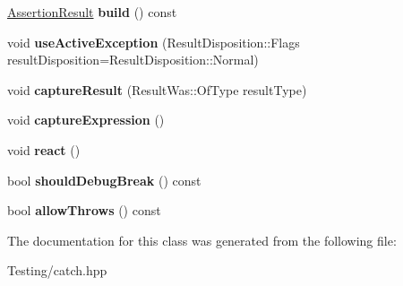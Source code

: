 \begin{DoxyCompactItemize}
\item 
\hypertarget{class_catch_1_1_result_builder_a31eba48feb02817d2151e31bd8331eeb}{\hyperlink{class_catch_1_1_assertion_result}{Assertion\-Result} {\bfseries build} () const }\label{class_catch_1_1_result_builder_a31eba48feb02817d2151e31bd8331eeb}

\item 
\hypertarget{class_catch_1_1_result_builder_a5bbd2f14a678f3e8d0f791ac6d233d65}{void {\bfseries use\-Active\-Exception} (Result\-Disposition\-::\-Flags result\-Disposition=Result\-Disposition\-::\-Normal)}\label{class_catch_1_1_result_builder_a5bbd2f14a678f3e8d0f791ac6d233d65}

\item 
\hypertarget{class_catch_1_1_result_builder_a10e467f7b7a4976e5d148b4d5066e8fd}{void {\bfseries capture\-Result} (Result\-Was\-::\-Of\-Type result\-Type)}\label{class_catch_1_1_result_builder_a10e467f7b7a4976e5d148b4d5066e8fd}

\item 
\hypertarget{class_catch_1_1_result_builder_af2ae2343965802eeeb0abbd4ea9d2d36}{void {\bfseries capture\-Expression} ()}\label{class_catch_1_1_result_builder_af2ae2343965802eeeb0abbd4ea9d2d36}

\item 
\hypertarget{class_catch_1_1_result_builder_a3085cdc46533d45bed6f652a2ac295c0}{void {\bfseries react} ()}\label{class_catch_1_1_result_builder_a3085cdc46533d45bed6f652a2ac295c0}

\item 
\hypertarget{class_catch_1_1_result_builder_a34cdbf7ad1e5b3cb4a94047f2d14bcb2}{bool {\bfseries should\-Debug\-Break} () const }\label{class_catch_1_1_result_builder_a34cdbf7ad1e5b3cb4a94047f2d14bcb2}

\item 
\hypertarget{class_catch_1_1_result_builder_a3dbf18a3a4b00173dab052a8864e435e}{bool {\bfseries allow\-Throws} () const }\label{class_catch_1_1_result_builder_a3dbf18a3a4b00173dab052a8864e435e}

\end{DoxyCompactItemize}


The documentation for this class was generated from the following file\-:\begin{DoxyCompactItemize}
\item 
Testing/catch.\-hpp\end{DoxyCompactItemize}
